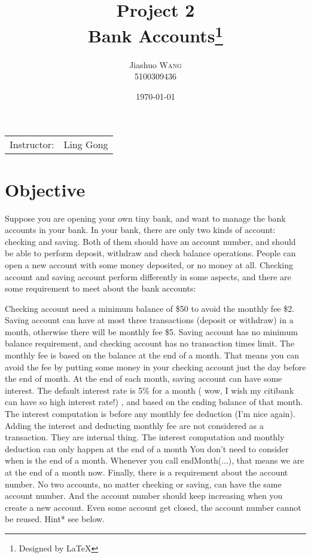 \documentclass{article}
\title{Project 2 \\ Bank Accounts\thanks{Designed by \LaTeX}} %
\author{Jiashuo \textsc{Wang} \\ 5100309436} %
\date{\today} %
\begin{document}
\maketitle %
\thispagestyle{fancy} %

\begin{center}
\begin{tabular}{l r}
Instructor: & Ling Gong %
\end{tabular}
\end{center}




\section{Objective}

Suppose you are opening your own tiny bank, and want to manage the bank accounts in your bank. In your bank, there are only two kinds of account: checking and saving. Both of them should have an account number, and should be able to perform deposit, withdraw and check balance operations. People can open a new account with some money deposited, or no money at all. Checking account and saving account perform differently in some aspects, and there are some requirement to meet about the bank accounts:

Checking account need a minimum balance of \$50 to avoid the monthly fee \$2.
Saving account can have at most three transactions (deposit or withdraw) in a month, otherwise there will be monthly fee \$5.
Saving account has no minimum balance requirement, and checking account has no transaction times limit.
The monthly fee is based on the balance at the end of a month. That means you can avoid the fee by putting some money in your checking account just the day before the end of month.
At the end of each month, saving account can have some interest. The default interest rate is 5\% for a month ( wow, I wish my citibank can have so high interest rate!) , and based on the ending balance of that month. The interest computation is before any monthly fee deduction (I'm nice again).
Adding the interest and deducting monthly fee are not considered as a transaction. They are internal thing.
The interest computation and monthly deduction can only happen at the end of a month
You don't need to consider when is the end of a month. Whenever you call endMonth(...), that means we are at the end of a month now.
Finally, there is a requirement about the account number. No two accounts, no matter checking or saving, can have the same account number. And the account number should keep increasing when you create a new account. Even some account get closed, the account number cannot be reused.  Hint* see below.
\end{document}
